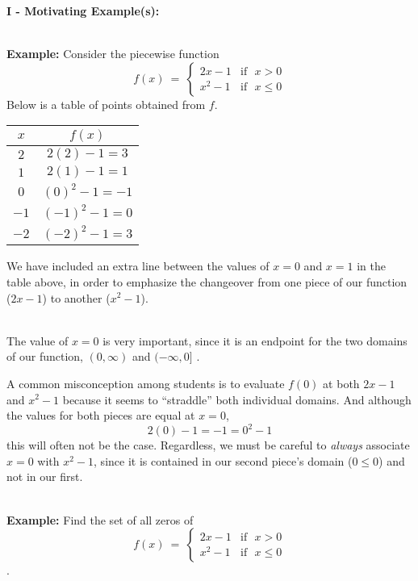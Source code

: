 \documentclass[12pt]{article}
\theoremstyle{definition}
\begin{document}
{\bf I - Motivating Example(s):}\\
\ \par
{\bf Example:} 
Consider the piecewise function \[ f(x)~=~
	\begin{cases} 
      2x-1 & \text{if~~} x> 0\\
			x^2-1 & \text{if~~} x\leq 0
  \end{cases}
\]
Below is a table of points obtained from $f$. 

\begin{multicols}{2}
\begin{center}
\begin{tabular}{c|c}
	$x$ & $f(x)$\\
	\hline
	$2$ & $2(2)-1=3$\\
	\hline
	$1$ & $2(1)-1=1$\\
	\hline \hline
	$0$ & $(0)^2-1=-1$\\
	\hline
	$-1$ & $(-1)^2-1=0$\\
	\hline
	$-2$ & $(-2)^2-1=3$
\end{tabular}
\end{center}

\columnbreak

We have included an extra line between the values of $x=0$ and $x=1$ in the table above, in order to emphasize the changeover from one piece of our function ($2x-1$) to another ($x^2-1$).\\
\ \par
The value of $x=0$ is very important, since it is an endpoint for the two domains of our function,  $(0,\infty)$ and $(-\infty,0]$ .  
\end{multicols}
A common misconception among students is to evaluate $f(0)$ at both $2x-1$ and $x^2-1$ because it seems to ``straddle'' both individual domains.  And although the values for both pieces are equal at $x=0$,
$$2(0)-1=-1=0^2-1$$ this will often not be the case.  Regardless, we must be careful to {\it always} associate $x=0$ with $x^2-1$, since it is contained in our second piece's domain ($0\leq 0$) and not in our first.\\
\ \par
{\bf Example:} Find the set of all zeros of \[ f(x)~=~
	\begin{cases} 
      2x-1 & \text{if~~} x> 0\\
			x^2-1 & \text{if~~} x\leq 0
  \end{cases}
\].
\end{document}
